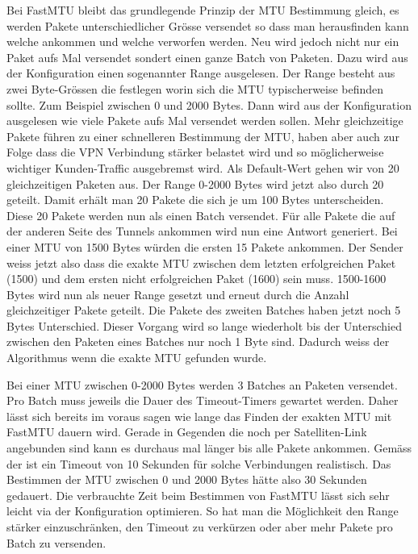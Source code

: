Bei FastMTU bleibt das grundlegende Prinzip der \acs{MTU} Bestimmung gleich, es werden Pakete unterschiedlicher Grösse versendet so dass man herausfinden kann welche ankommen und welche verworfen werden. Neu wird jedoch nicht nur ein Paket aufs Mal versendet sondert einen ganze Batch von Paketen. Dazu wird aus der Konfiguration einen sogenannter Range ausgelesen. Der Range besteht aus zwei Byte-Grössen die festlegen worin sich die \acs{MTU} typischerweise befinden sollte. Zum Beispiel zwischen 0 und 2000 Bytes. Dann wird aus der Konfiguration ausgelesen wie viele Pakete aufs Mal versendet werden sollen. Mehr gleichzeitige Pakete führen zu einer schnelleren Bestimmung der \acs{MTU}, haben aber auch zur Folge dass die \acs{VPN} Verbindung stärker belastet wird und so möglicherweise wichtiger Kunden-Traffic ausgebremst wird. Als Default-Wert gehen wir von 20 gleichzeitigen Paketen aus. Der Range 0-2000 Bytes wird jetzt also durch 20 geteilt. Damit erhält man 20 Pakete die sich je um 100 Bytes unterscheiden. Diese 20 Pakete werden nun als einen Batch versendet.
Für alle Pakete die auf der anderen Seite des Tunnels ankommen wird nun eine Antwort generiert. Bei einer MTU von 1500 Bytes würden die ersten 15 Pakete ankommen. Der Sender weiss jetzt also dass die exakte \acs{MTU} zwischen dem letzten erfolgreichen Paket (1500) und dem ersten nicht erfolgreichen Paket (1600) sein muss. 1500-1600 Bytes wird nun als neuer Range gesetzt und erneut durch die Anzahl gleichzeitiger Pakete geteilt. Die Pakete des zweiten Batches haben jetzt noch 5 Bytes Unterschied. Dieser Vorgang wird so lange wiederholt bis der Unterschied zwischen den Paketen eines Batches nur noch 1 Byte sind. Dadurch weiss der Algorithmus wenn die exakte \acs{MTU} gefunden wurde.

Bei einer MTU zwischen 0-2000 Bytes werden 3 Batches an Paketen versendet. Pro Batch muss jeweils die Dauer des Timeout-Timers gewartet werden. Daher lässt sich bereits im voraus sagen wie lange das Finden der exakten \acs{MTU} mit FastMTU dauern wird. Gerade in Gegenden die noch per Satelliten-Link angebunden sind kann es durchaus mal länger bis alle Pakete ankommen. Gemäss der \osag ist ein Timeout von 10 Sekunden für solche Verbindungen realistisch. Das Bestimmen der \acs{MTU} zwischen 0 und 2000 Bytes hätte also 30 Sekunden gedauert.
Die verbrauchte Zeit beim Bestimmen von FastMTU lässt sich sehr leicht via der Konfiguration optimieren. So hat man die Möglichkeit den Range stärker einzuschränken, den Timeout zu verkürzen oder aber mehr Pakete pro Batch zu versenden.

